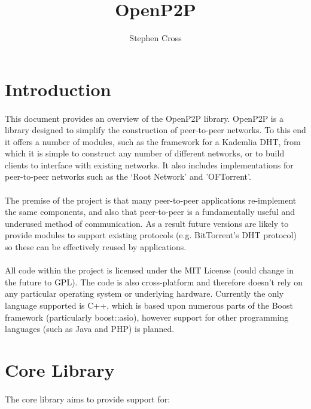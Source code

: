 \documentclass{article}
\title{OpenP2P}
\author{Stephen Cross}
\date{}
\begin{document}
\maketitle

\section{Introduction}

\paragraph{}
This document provides an overview of the OpenP2P library. OpenP2P is a library designed to simplify the construction of peer-to-peer networks. To this end it offers a number of modules, such as the framework for a Kademlia DHT, from which it is simple to construct any number of different networks, or to build clients to interface with existing networks. It also includes implementations for peer-to-peer networks such as the `Root Network' and 'OFTorrent'.

\paragraph{}
The premise of the project is that many peer-to-peer applications re-implement the same components, and also that peer-to-peer is a fundamentally useful and underused method of communication. As a result future versions are likely to provide modules to support existing protocols (e.g. BitTorrent's DHT protocol) so these can be effectively reused by applications.

\paragraph{}
All code within the project is licensed under the MIT License (could change in the future to GPL). The code is also cross-platform and therefore doesn't rely on any particular operating system or underlying hardware. Currently the only language supported is C++, which is based upon numerous parts of the Boost framework (particularly boost::asio), however support for other programming languages (such as Java and PHP) is planned.

\section{Core Library}

\paragraph{}
The core library aims to provide support for:
\end{document}
